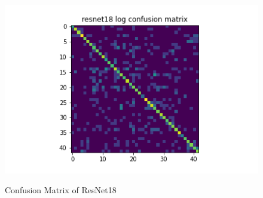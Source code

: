 \begin{figure}[H]
\begin{minipage}[b]{.5\linewidth}
  \end{minipage}
  \hfill
  \begin{minipage}[b]{.5\linewidth}
    \centering

    {\includegraphics[width=1.2\textwidth]{figs/conf_matrix/resnet18_log_conf.png}}
  \end{minipage}

  \caption{Confusion Matrix of ResNet18}
  \label{fig:resnet18_conf}
  \vspace{0.2in}
\end{figure}

